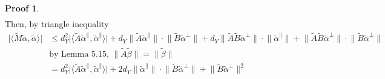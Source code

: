 \documentclass{book}
\newcommand{\inner}[1]{\langle #1 \rangle}
\newcommand{\norm}[1]{\lVert #1 \rVert}
\newcommand{\abs}[1]{\lvert #1 \rvert }
\theoremstyle{definition}
\theoremstyle{remarkstyle}
\newtheorem*{myproof}{Proof}%
\begin{document}
\begin{myproof}
\begin{align*}
    \end{align*}
    Then, by triangle inequality 
    \begin{align*}
        \abs{\inner{\tilde{M}\tilde{\alpha}, \tilde{\alpha}}}
        &\le d^2_Y\abs{\inner{\tilde{A}\tilde{\alpha}^{\parallel},\tilde{\alpha}^{\parallel}}} + d_Y\norm{\tilde{A}\tilde{\alpha}^{\parallel}} \cdot \norm{\tilde{B}\tilde{\alpha}^{\perp}} + d_Y\norm{\tilde{A}\tilde{B}\tilde{\alpha}^{\perp}} \cdot \norm{\tilde{\alpha}^{\parallel}} + \norm{\tilde{A}\tilde{B}\tilde{\alpha}^{\perp}} \cdot \norm{\tilde{B}\tilde{\alpha}^{\perp}} \\
        &\textrm{by Lemma 5.15, $\norm{\tilde{A}\tilde{\beta}}=\norm{\tilde{\beta}}$} \\
        &= d^2_Y\abs{\inner{\tilde{A}\tilde{\alpha}^{\parallel},\tilde{\alpha}^{\parallel}}} + 2d_Y\norm{\tilde{\alpha}^{\parallel}} \cdot \norm{\tilde{B}\tilde{\alpha}^{\perp}} + \norm{\tilde{B}\tilde{\alpha}^{\perp}}^{2}
    \end{align*}
    \newline
\end{myproof}
\end{document}
